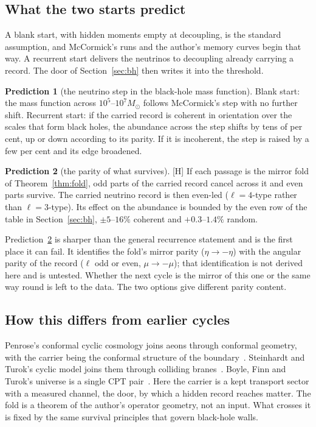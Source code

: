 \documentclass[11pt]{article}
\theoremstyle{definition}\newtheorem{hypothesis}{Hypothesis}\newtheorem{prediction}{Prediction}
\theoremstyle{remark}\newtheorem{remark}[theorem]{Remark}
\newcommand{\grade}[1]{\textsf{\small[#1]}}
\begin{document}
\subsection{What the two starts predict}
A blank start, with hidden moments empty at decoupling, is the standard assumption, and McCormick's runs and the author's memory curves begin that way. A recurrent start delivers the neutrinos to decoupling already carrying a record. The door of Section~\ref{sec:bh} then writes it into the threshold.
\begin{prediction}[the neutrino step in the black-hole mass function]\label{pred:mf}
Blank start: the mass function across $10^5$--$10^7M_\odot$ follows McCormick's step with no further shift. Recurrent start: if the carried record is coherent in orientation over the scales that form black holes, the abundance across the step shifts by tens of per cent, up or down according to its parity. If it is incoherent, the step is raised by a few per cent and its edge broadened.
\end{prediction}
\begin{prediction}[the parity of what survives]\label{pred:parity}\grade{H}
If each passage is the mirror fold of Theorem~\ref{thm:fold}, odd parts of the carried record cancel across it and even parts survive. The carried neutrino record is then even-led ($\ell=4$-type rather than $\ell=3$-type). Its effect on the abundance is bounded by the even row of the table in Section~\ref{sec:bh}, $\pm5$--$16\%$ coherent and $+0.3$--$1.4\%$ random.
\end{prediction}
Prediction~\ref{pred:parity} is sharper than the general recurrence statement and is the first place it can fail. It identifies the fold's mirror parity ($\eta\to-\eta$) with the angular parity of the record ($\ell$ odd or even, $\mu\to-\mu$); that identification is not derived here and is untested. Whether the next cycle is the mirror of this one or the same way round is left to the data. The two options give different parity content.

\subsection{How this differs from earlier cycles}
Penrose's conformal cyclic cosmology joins aeons through conformal geometry, with the carrier being the conformal structure of the boundary~\cite{CCC}. Steinhardt and Turok's cyclic model joins them through colliding branes~\cite{ST}. Boyle, Finn and Turok's universe is a single CPT pair~\cite{BFT}. Here the carrier is a kept transport sector with a measured channel, the door, by which a hidden record reaches matter. The fold is a theorem of the author's operator geometry, not an input. What crosses it is fixed by the same survival principles that govern black-hole walls.
\end{document}

